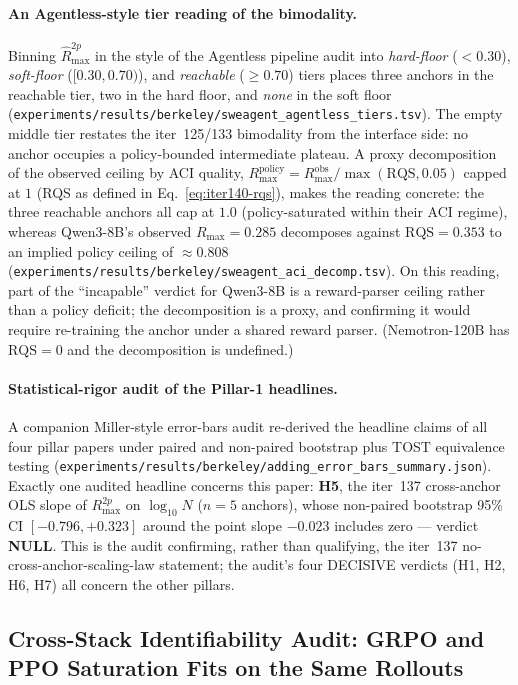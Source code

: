 \documentclass{article}
\begin{document}
\paragraph{An Agentless-style tier reading of the bimodality.}
Binning $\hat R_{\max}^{2p}$ in the style of the Agentless
pipeline audit \citep{xia2024agentless} into \emph{hard-floor}
($< 0.30$), \emph{soft-floor} ($[0.30, 0.70)$), and \emph{reachable}
($\geq 0.70$) tiers places three anchors in the reachable tier, two in
the hard floor, and \emph{none} in the soft floor
(\texttt{experiments/results/berkeley/sweagent\_agentless\_tiers.tsv}).
The empty middle tier restates the iter~125/133 bimodality from the
interface side: no anchor occupies a policy-bounded intermediate
plateau.  A proxy decomposition of the observed ceiling by ACI
quality, $R_{\max}^{\text{policy}} = R_{\max}^{\text{obs}} /
\max(\mathrm{RQS}, 0.05)$ capped at $1$ (RQS as defined in
Eq.~\ref{eq:iter140-rqs}), makes the reading
concrete: the three reachable anchors all cap at $1.0$
(policy-saturated within their ACI regime), whereas Qwen3-8B's
observed $R_{\max} = 0.285$ decomposes against $\mathrm{RQS} = 0.353$
to an implied policy ceiling of $\approx 0.808$
(\texttt{experiments/results/berkeley/sweagent\_aci\_decomp.tsv}).
On this reading, part of the ``incapable'' verdict for Qwen3-8B is a
reward-parser ceiling rather than a policy deficit; the decomposition
is a proxy, and confirming it would require re-training the anchor
under a shared reward parser.  (Nemotron-120B has $\mathrm{RQS} = 0$
and the decomposition is undefined.)

\paragraph{Statistical-rigor audit of the Pillar-1 headlines.}
A companion Miller-style error-bars audit \citep{miller2024erroreval}
re-derived the headline claims of all four pillar papers under paired
and non-paired bootstrap plus TOST equivalence testing
(\texttt{experiments/results/berkeley/adding\_error\_bars\_summary.json}).
Exactly one audited headline concerns this paper: \textbf{H5}, the
iter~137 cross-anchor OLS slope of $R_{\max}^{2p}$ on $\log_{10} N$
($n = 5$ anchors), whose non-paired bootstrap 95\% CI
$[-0.796, +0.323]$ around the point slope $-0.023$ includes zero ---
verdict \textbf{NULL}.  This is the audit confirming, rather than
qualifying, the iter~137 no-cross-anchor-scaling-law statement; the
audit's four
DECISIVE verdicts (H1, H2, H6, H7) all concern the other pillars.
 \subsection{Cross-Stack Identifiability Audit: GRPO and PPO Saturation Fits on the Same Rollouts}
\label{sec:scaling-law-iter29}
\end{document}
